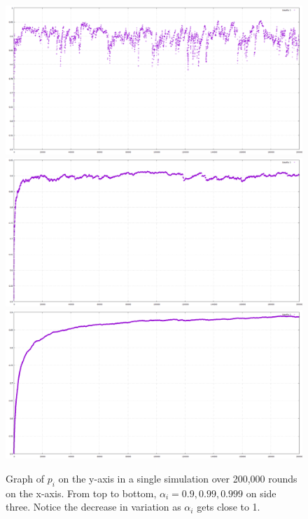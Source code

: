 \documentclass{article}
\begin{document}
\begin{figure}[htp]
\centering
\includegraphics[width=.8\textwidth]{images/ai9side3x200000}\hfill
\includegraphics[width=.8\textwidth]{images/ai99side3x200000}\hfill
\includegraphics[width=.8\textwidth]{images/ai999side3x200000}
\caption{Graph of $p_i$ on the y-axis in a single simulation over 200,000 rounds on the x-axis. From top to bottom, $\alpha_i = 0.9, 0.99, 0.999$ on side three.  Notice the decrease in variation as $\alpha_i$ gets close to 1.}
\label{fig:figure3}
\end{figure}
\end{document}
